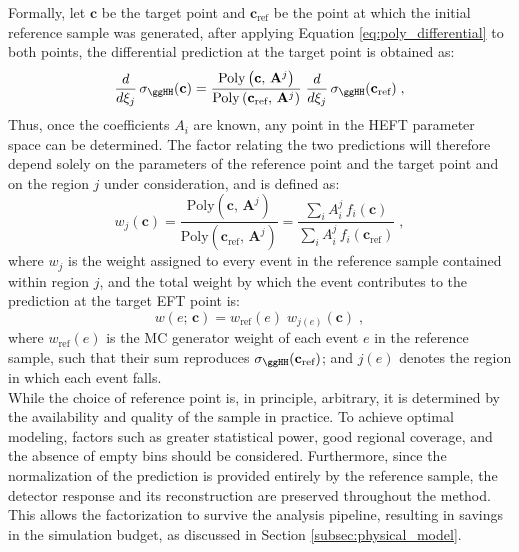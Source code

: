 Formally, let $\mathbf{c}$ be the target point and $\mathbf{c}_{\text{ref}}$ be the point at which the initial reference sample was generated, after applying Equation \ref{eq:poly_differential} to both points, the differential prediction at the target point is obtained as:
%
\begin{equation}
    \frac{d}{d\xi_j}\,\sigma_{\ggHH}(\mathbf{c})
    = \frac{\mathrm{Poly}\left(\mathbf{c},\,\mathbf{A}^{j}\right)}
           {\mathrm{Poly}\left(\mathbf{c}_{\text{ref}},\,\mathbf{A}^{j}\right)}\;
      \frac{d}{d\xi_j}\,\sigma_{\ggHH}(\mathbf{c}_{\text{ref}})\;,
\label{eq:elr_master}
\end{equation}
%
Thus, once the coefficients $A_i$ are known, any point in the HEFT parameter space can be determined. The factor relating the two predictions will therefore depend solely on the parameters of the reference point and the target point and on the region $j$ under consideration, and is defined as:
%
\begin{equation}
    w_j(\mathbf{c})
    = \frac{\mathrm{Poly}\left(\mathbf{c},\,\mathbf{A}^{j}\right)}
           {\mathrm{Poly}\left(\mathbf{c}_{\text{ref}},\,\mathbf{A}^{j}\right)}
    = \frac{\sum_{i} A^{j}_i\, f_i(\mathbf{c})}
           {\sum_{i} A^{j}_i\, f_i(\mathbf{c}_{\text{ref}})}\;,
\label{eq:elr_weight}
\end{equation}
%
where $w_j$ is the weight assigned to every event in the reference sample contained within region $j$, and the total weight by which the event contributes to the prediction at the target EFT point is:
%
\begin{equation}
    w(e;\,\mathbf{c}) = w_{\text{ref}}(e)\;w_{j(e)}(\mathbf{c})\;,
\label{eq:elr_event_weight}
\end{equation}
%
where $w_{\text{ref}}(e)$ is the MC generator weight of each event $e$ in the reference sample, such that their sum reproduces $\sigma_{\ggHH}(\mathbf{c}_{\text{ref}})$; and $j(e)$ denotes the region in which each event falls.\\

While the choice of reference point is, in principle, arbitrary, it is determined by the availability and quality of the sample in practice. To achieve optimal modeling, factors such as greater statistical power, good regional coverage, and the absence of empty bins should be considered. Furthermore, since the normalization of the prediction is provided entirely by the reference sample, the detector response and its reconstruction are preserved throughout the method. This allows the factorization to survive the analysis pipeline, resulting in savings in the simulation budget, as discussed in Section \ref{subsec:physical_model}.


